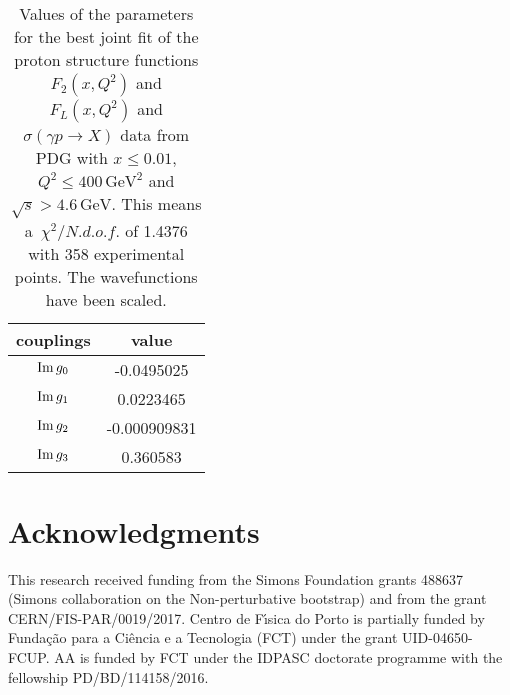 \documentclass[preprint, 12pt]{elsarticle}
\begin{document}
\begin{table}[b!]
\centering
\caption{Values of the parameters for the best joint fit of the proton structure functions $F_2\left(x, Q^2\right)$ and $F_L\left(x, Q^2\right)$ and $\sigma\left(\gamma p \rightarrow X\right)$ data from PDG with $x \leq 0.01$, $Q^2 \leq 400 \, \text{GeV}^2$ and $\sqrt{s} > 4.6 \, \text{GeV}$. This means a~$\chi^2 / {N.d.o.f.}$ of 1.4376 with 358 experimental points. The wavefunctions have been scaled.}
\vspace{0.5cm}
\begin{tabular}{|c|c|}
\hline
couplings   & value \\
\hline
${\rm Im} \, g_0$  & -0.0495025\\ 
\hline
${\rm Im} \, g_1$  & 0.0223465 \\ 
\hline
${\rm Im} \, g_2$  & -0.000909831 \\
\hline
${\rm Im} \, g_3$  & 0.360583 \\ 
\hline
\end{tabular}
\label{table:GammaProton_best_joint_fit_scaled}
\end{table}

\section{Acknowledgments}

This research received funding from the Simons Foundation grants 488637  (Simons collaboration on the Non-perturbative bootstrap)
and from the  grant CERN/FIS-PAR/0019/2017. 
Centro de F\'\i sica do Porto is partially funded by Funda\c c\~ao para a Ci\^encia e a Tecnologia (FCT) under the grant
UID-04650-FCUP.
 AA is funded by FCT under the IDPASC doctorate programme with the fellowship  PD/BD/114158/2016.



\end{document}
